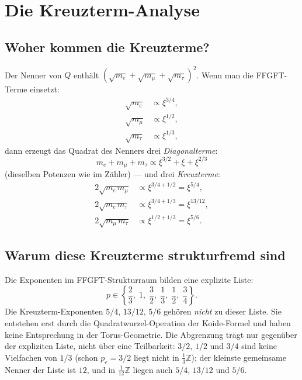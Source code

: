 \section{Die Kreuzterm-Analyse}

\subsection{Woher kommen die Kreuzterme?}

Der Nenner von $Q$ enthält $(\sqrt{m_e}+\sqrt{m_\mu}+\sqrt{m_\tau})^2$.
Wenn man die FFGFT-Terme einsetzt:
\begin{align*}
  \sqrt{m_e} &\propto \xi^{3/4}, \\
  \sqrt{m_\mu} &\propto \xi^{1/2}, \\
  \sqrt{m_\tau} &\propto \xi^{1/3},
\end{align*}
dann erzeugt das Quadrat des Nenners drei \emph{Diagonalterme}:
\begin{equation}
  m_e + m_\mu + m_\tau \propto \xi^{3/2} + \xi + \xi^{2/3}
\end{equation}
(dieselben Potenzen wie im Zähler) — und drei \emph{Kreuzterme}:
\begin{align}
  2\sqrt{m_e\,m_\mu} &\propto \xi^{3/4+1/2} = \xi^{5/4}, \label{eq:k1}\\
  2\sqrt{m_e\,m_\tau} &\propto \xi^{3/4+1/3} = \xi^{13/12}, \label{eq:k2}\\
  2\sqrt{m_\mu\,m_\tau} &\propto \xi^{1/2+1/3} = \xi^{5/6}. \label{eq:k3}
\end{align}

\subsection{Warum diese Kreuzterme strukturfremd sind}

Die Exponenten im FFGFT-Strukturraum bilden eine explizite Liste:
\[
  p \in \left\{\frac{2}{3},\; 1,\; \frac{3}{2},\; \frac{1}{3},\; \frac{1}{2},\; \frac{3}{4}\right\}.
\]
Die Kreuzterm-Exponenten $5/4$, $13/12$, $5/6$ gehören \emph{nicht} zu dieser
Liste. Sie entstehen erst durch die Quadratwurzel-Operation der Koide-Formel
und haben keine Entsprechung in der Torus-Geometrie.
Die Abgrenzung trägt nur gegenüber der expliziten Liste, nicht über eine
Teilbarkeit: $3/2$, $1/2$ und $3/4$ sind keine Vielfachen von $1/3$ (schon
$p_e = 3/2$ liegt nicht in $\frac{1}{3}\mathbb{Z}$); der kleinste gemeinsame
Nenner der Liste ist $12$, und in $\frac{1}{12}\mathbb{Z}$ liegen auch $5/4$,
$13/12$ und $5/6$.

